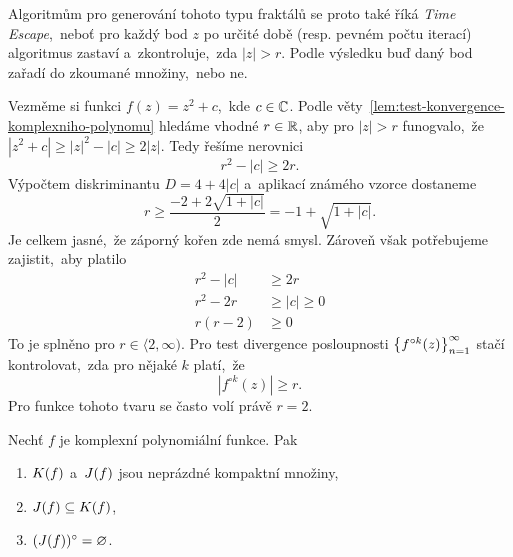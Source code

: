 Algoritmům pro generování tohoto typu fraktálů se proto také říká \emph{Time Escape},~neboť pro každý bod $z$ po určité době (resp. pevném počtu iterací) algoritmus zastaví a~zkontroluje,~zda $|z|>r$. Podle výsledku buď daný bod zařadí do zkoumané množiny,~nebo ne.
\begin{example}
    Vezměme si funkci $f(z)=z^2+c$,~kde $c\in\mathbb{C}$. Podle věty~\ref{lem:test-konvergence-komplexniho-polynomu} hledáme vhodné $r\in\mathbb{R}$, aby pro $|z|>r$ funogvalo,~že $|z^2+c|\geqslant|z|^2-|c|\geqslant 2|z|$. Tedy řešíme nerovnici
    \[r^2-|c|\geqslant 2r.\]
    Výpočtem diskriminantu $D=4+4|c|$ a~aplikací známého vzorce dostaneme
    \[r\geqslant\frac{-2+2\sqrt{1+|c|}}{2}=-1+\sqrt{1+|c|}.\]
    Je celkem jasné,~že záporný kořen zde nemá smysl. Zároveň však potřebujeme zajistit,~aby platilo
    \begin{align*}
        r^2-|c|&\geqslant 2r\\
        r^2-2r&\geqslant|c|\geqslant 0\\
        r(r-2)&\geqslant 0
    \end{align*}
    To je splněno pro $r\in\langle 2,\infty)$. Pro test divergence posloupnosti $\left\{f^{\circ k}(z)\right\}_{n=1}^\infty$ stačí kontrolovat,~zda pro nějaké $k$ platí,~že
    \[|f^{\circ k}(z)|\geqslant r.\]
    Pro funkce tohoto tvaru se často volí právě $r=2$.
\end{example}
\begin{theorem}\label{thm:vztah-kf-a-jf}
    Nechť $f$ je komplexní polynomiální funkce. Pak
    \begin{enumerate}[label=(\roman*)]
        \item\label{thm:kompaktnost-kf-jf} $K(f)$ a~$J(f)$ jsou neprázdné kompaktní množiny,
        \item\label{thm:jf-podmnozina-kf} $J(f)\subseteq K(f)$,
        \item\label{thm:vnitrek-jf-neprazdny} $(J(f))^\circ=\varnothing$.
    \end{enumerate}
\end{theorem}
